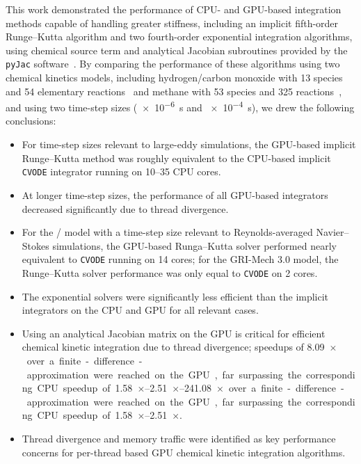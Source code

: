 \documentclass[preprint,review,11pt]{elsarticle}
\begin{document}
This work demonstrated the performance of CPU- and GPU-based integration methods capable of handling greater stiffness, including an implicit fifth-order Runge--Kutta algorithm and two fourth-order exponential integration algorithms, using chemical source term and analytical Jacobian subroutines provided by the \texttt{pyJac} software~\cite{niemeyer_2016_51139,Niemeyer:2015ws,Niemeyer:2016aa}.
By comparing the performance of these algorithms using two chemical kinetics models, including hydrogen\slash carbon monoxide with 13 species and 54 elementary reactions~\cite{Burke:2011fh} and methane with 53 species and 325 reactions~\cite{smith_gri-mech_30}, and using two time-step sizes (\SI{e-6}{\second} and \SI{e-4}{\second}), we drew the following conclusions:
\begin{itemize}
 \item For time-step sizes relevant to large-eddy simulations, the GPU-based implicit Runge--Kutta method was roughly equivalent to the CPU-based implicit \texttt{CVODE} integrator running on \numrange{10}{35} CPU cores.
 \item At longer time-step sizes, the performance of all GPU-based integrators decreased significantly due to thread divergence.
 \item For the \slash{} model with a time-step size relevant to Reynolds-averaged Navier--Stokes simulations, the GPU-based Runga--Kutta solver performed nearly equivalent to \texttt{CVODE} running on \num{14} cores; for the GRI-Mech 3.0 model, the Runge--Kutta solver performance was only equal to \texttt{CVODE} on \num{2} cores.
 \item The exponential solvers were significantly less efficient than the implicit integrators on the CPU and GPU for all relevant cases.
 \item Using an analytical Jacobian matrix on the GPU is critical for efficient chemical kinetic integration due to thread divergence; speedups of \SIrange{8.09}{241.08}{$\times$} over a finite-difference-approximation were reached on the GPU, far surpassing the corresponding CPU speedup of \SIrange{1.58}{2.51}{$\times$}.
 \item Thread divergence and memory traffic were identified as key performance concerns for per-thread based GPU chemical kinetic integration algorithms.
\end{itemize}
\end{document}
